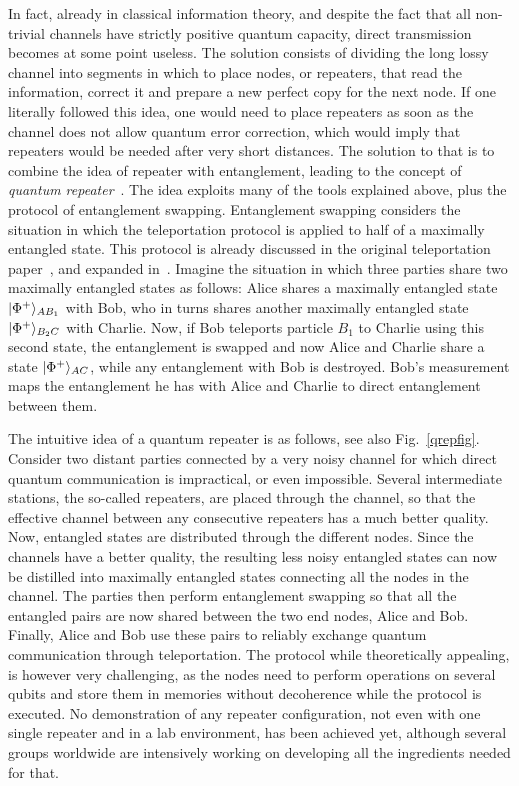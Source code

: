 \documentclass[a4paper]{article}
\begin{document}
In fact, already in classical information theory, and despite the fact that all non-trivial channels have strictly positive quantum capacity, direct transmission becomes at some point useless. The solution consists of dividing the long lossy channel into segments in which to place nodes, or repeaters, that read the information, correct it and prepare a new perfect copy for the next node. If one literally followed this idea, one would need to place repeaters as soon as the channel does not allow quantum error correction, which would imply that repeaters would be needed after very short distances. The solution to that is to combine the idea of repeater with entanglement, leading to the concept of \emph{quantum repeater}~\cite{qrep}. The idea exploits many of the tools explained above, plus the protocol of entanglement swapping. Entanglement swapping considers the situation in which the teleportation protocol is applied to half of a maximally entangled state. This protocol is already discussed in the original teleportation paper~\cite{teleportation}, and expanded in~\cite{entswap}. Imagine the situation in which three parties share two maximally entangled states as follows: Alice shares a maximally entangled state $|\Phi^+\rangle_{AB_1}$ with Bob, who in turns shares another maximally entangled state $|\Phi^+\rangle_{B_2C}$ with Charlie. Now, if Bob teleports particle $B_1$ to Charlie using this second state, the entanglement is swapped and now Alice and Charlie share a state $|\Phi^+\rangle_{AC}$, while any entanglement with Bob is destroyed. Bob's measurement maps the entanglement he has with Alice and Charlie to direct entanglement between them.

The intuitive idea of a quantum repeater is as follows, see also Fig.~\ref{qrepfig}. Consider two distant parties connected by a very noisy channel for which direct quantum communication is impractical, or even impossible. Several intermediate stations, the so-called repeaters, are placed through the channel, so that the effective channel between any consecutive repeaters has a much better quality. Now, entangled states are distributed through the different nodes. Since the channels have a better quality, the resulting less noisy entangled states can now be distilled into maximally entangled states connecting all the nodes in the channel. The parties then perform entanglement swapping so that all the entangled pairs are now shared between the two end nodes, Alice and Bob. Finally, Alice and Bob use these pairs to reliably exchange quantum communication through teleportation. The protocol while theoretically appealing, is however very challenging, as the nodes need to perform operations on several qubits and store them in memories without decoherence while the protocol is executed. No demonstration of any repeater configuration, not even with one single repeater and in a lab environment, has been achieved yet, although several groups worldwide are intensively working on developing all the ingredients needed for that.
\end{document}
